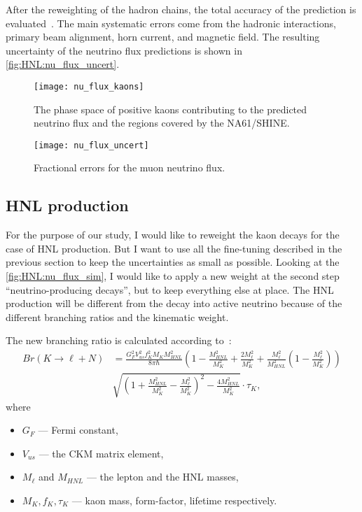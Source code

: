\documentclass[../main.tex]{subfiles}
\begin{document}
After the reweighting of the hadron chains, the total accuracy of the prediction is evaluated~\cite{Abe2013}. The main systematic errors come from the hadronic interactions, primary beam alignment, horn current, and magnetic field. The resulting uncertainty of the neutrino flux predictions is shown in \autoref{fig:HNL:nu_flux_uncert}.

\begin{figure}[!ht]
    \begin{minipage}[!ht]{0.49\linewidth}
        \centering
        \texttt{[image: nu\_flux\_kaons]}
        \caption{The phase space of positive kaons contributing to the predicted neutrino flux and the regions covered by the NA61/SHINE.}
        \label{fig:HNL:kaon_ps}
    \end{minipage}
    \hfill
    \begin{minipage}[!ht]{0.49\linewidth}
        \centering
        \texttt{[image: nu\_flux\_uncert]}
        \caption{Fractional errors for the muon neutrino flux.}
        \label{fig:HNL:nu_flux_uncert}
    \end{minipage}
\end{figure}


\subsection{HNL production}
For the purpose of our study, I would like to reweight the kaon decays for the case of HNL production. But I want to use all the fine-tuning described in the previous section to keep the uncertainties as small as possible. Looking at the \autoref{fig:HNL:nu_flux_sim}, I would like to apply a new weight at the second step ``neutrino-producing decays'', but to keep everything else at place. The HNL production will be different from the decay into active neutrino because of the different branching ratios and the kinematic weight.

The new branching ratio is calculated according to~\cite{Gorbunov2007}:
\begin{equation}
    \begin{split}
    Br(K\rightarrow \ell+N)&=\frac{G_F^2 V_{us}^2 f_K^2 M_K M_{HNL}^2}{8\pi\hbar}\left(1-\frac{M_{HNL}^2}{M_K^2}+\frac{2M_\ell ^2}{M_K^2}+\frac{M_\ell^2}{M_{HNL}^2}\left(1-\frac{M_\ell^2}{M_K^2}\right)\right) \\
&\sqrt{\left(1+\frac{M_{HNL}^2}{M_K^2}-\frac{M_\ell^2}{M_K^2}\right)^2-\frac{4M_{HNL}^2}{M_K^2}} \cdot\tau_K,
    \end{split}
    \label{eq:HNL:Kdecay}
\end{equation}
where
\begin{itemize}
\item $G_F$ --- Fermi constant,
\item $V_{us}$ --- the CKM matrix element,
\item $M_\ell$ and $M_{HNL}$ --- the lepton and the HNL masses,
\item $M_K, f_K, \tau_K$ --- kaon mass, form-factor, lifetime respectively.
\end{itemize}
\end{document}
